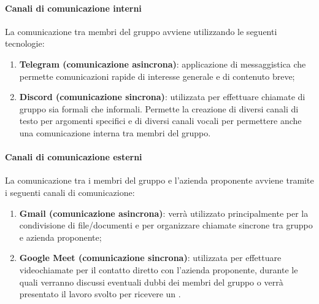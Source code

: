 \paragraph{Canali di comunicazione interni}
\label{subpar:canali_interni}
La comunicazione tra membri del gruppo avviene utilizzando le seguenti tecnologie:
\begin{enumerate}
    \item \textbf{Telegram (comunicazione asincrona)}: applicazione di messaggistica che permette comunicazioni rapide di interesse generale e di contenuto breve;

    \item \textbf{Discord (comunicazione sincrona)}: utilizzata per effettuare chiamate di gruppo sia formali che informali.
    Permette la creazione di diversi canali di testo per argomenti specifici e di diversi canali vocali per permettere anche una comunicazione interna tra membri del gruppo. 
\end{enumerate}

\paragraph{Canali di comunicazione esterni}
La comunicazione tra i membri del gruppo e l'azienda proponente avviene tramite i seguenti canali di comunicazione:
\begin{enumerate}
    \item \textbf{Gmail (comunicazione asincrona)}: verrà utilizzato principalmente per la condivisione di file/documenti e per organizzare chiamate sincrone tra gruppo e azienda proponente;

    \item \textbf{Google Meet (comunicazione sincrona)}: utilizzata per effettuare videochiamate per il contatto diretto con l'azienda proponente, durante le quali verranno discussi eventuali dubbi dei membri del gruppo o verrà presentato il lavoro svolto per ricevere un .
\end{enumerate}
